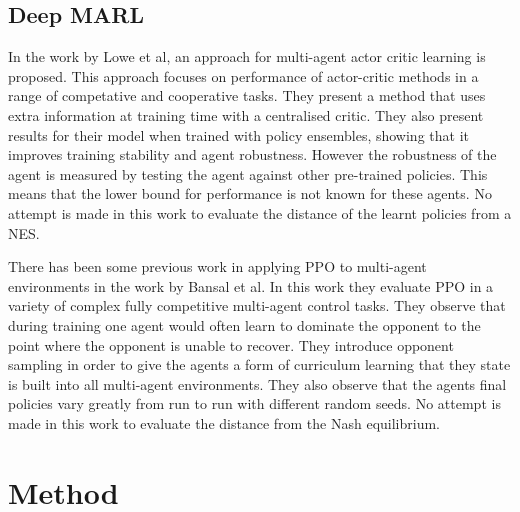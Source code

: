 \documentclass[conference]{IEEEtran}
\begin{document}

\subsection{Deep MARL}

In the work by Lowe et al\cite{lowe2017multi}, an approach for multi-agent actor critic learning is proposed. This approach focuses on performance of actor-critic methods in a range of competative and cooperative tasks. They present a method that uses extra information at training time with a centralised critic. They also present results for their model when trained with policy ensembles, showing that it improves training stability and agent robustness. However the robustness of the agent is measured by testing the agent against other pre-trained policies. This means that the lower bound for performance is not known for these agents. No attempt is made in this work to evaluate the distance of the learnt policies from a NES.

There has been some previous work in applying PPO to multi-agent environments in the work by Bansal et al\cite{bansal2017emergent}. In this work they evaluate PPO in a variety of complex fully competitive multi-agent control tasks. They observe that during training one agent would often learn to dominate the opponent to the point where the opponent is unable to recover. They introduce opponent sampling in order to give the agents a form of curriculum learning that they state is built into all multi-agent environments. They also observe that the agents final policies vary greatly from run to run with different random seeds. No attempt is made in this work to evaluate the distance from the Nash equilibrium. 

\section{Method}
\end{document}
